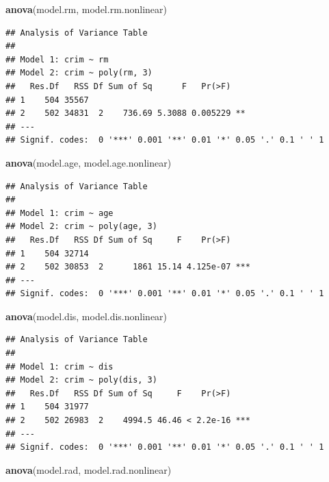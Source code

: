 \documentclass[]{article}
\newenvironment{Shaded}{\begin{snugshade}}{\end{snugshade}}
\newcommand{\KeywordTok}[1]{\textcolor[rgb]{0.13,0.29,0.53}{\textbf{#1}}}
\newcommand{\NormalTok}[1]{#1}
\begin{document}
\begin{Shaded}
\begin{Highlighting}[]
\KeywordTok{anova}\NormalTok{(model.rm, model.rm.nonlinear)}
\end{Highlighting}
\end{Shaded}

\begin{verbatim}
## Analysis of Variance Table
## 
## Model 1: crim ~ rm
## Model 2: crim ~ poly(rm, 3)
##   Res.Df   RSS Df Sum of Sq      F   Pr(>F)   
## 1    504 35567                                
## 2    502 34831  2    736.69 5.3088 0.005229 **
## ---
## Signif. codes:  0 '***' 0.001 '**' 0.01 '*' 0.05 '.' 0.1 ' ' 1
\end{verbatim}

\begin{Shaded}
\begin{Highlighting}[]
\KeywordTok{anova}\NormalTok{(model.age, model.age.nonlinear)}
\end{Highlighting}
\end{Shaded}

\begin{verbatim}
## Analysis of Variance Table
## 
## Model 1: crim ~ age
## Model 2: crim ~ poly(age, 3)
##   Res.Df   RSS Df Sum of Sq     F    Pr(>F)    
## 1    504 32714                                 
## 2    502 30853  2      1861 15.14 4.125e-07 ***
## ---
## Signif. codes:  0 '***' 0.001 '**' 0.01 '*' 0.05 '.' 0.1 ' ' 1
\end{verbatim}

\begin{Shaded}
\begin{Highlighting}[]
\KeywordTok{anova}\NormalTok{(model.dis, model.dis.nonlinear)}
\end{Highlighting}
\end{Shaded}

\begin{verbatim}
## Analysis of Variance Table
## 
## Model 1: crim ~ dis
## Model 2: crim ~ poly(dis, 3)
##   Res.Df   RSS Df Sum of Sq     F    Pr(>F)    
## 1    504 31977                                 
## 2    502 26983  2    4994.5 46.46 < 2.2e-16 ***
## ---
## Signif. codes:  0 '***' 0.001 '**' 0.01 '*' 0.05 '.' 0.1 ' ' 1
\end{verbatim}

\begin{Shaded}
\begin{Highlighting}[]
\KeywordTok{anova}\NormalTok{(model.rad, model.rad.nonlinear)}
\end{Highlighting}
\end{Shaded}
\end{document}
